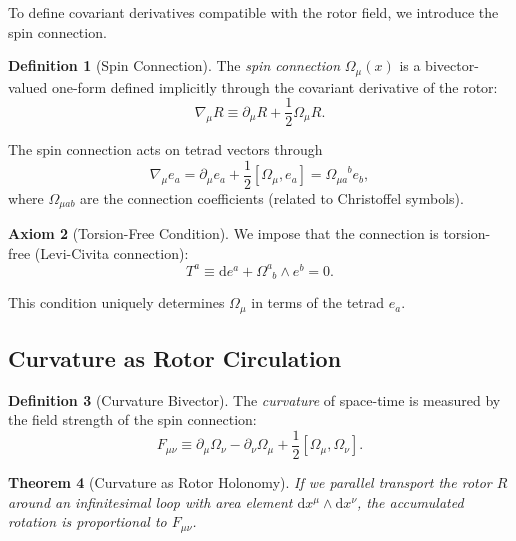\documentclass[11pt,a4paper]{article}
\numberwithin{equation}{section}
\theoremstyle{plain}
\newtheorem{theorem}{Theorem}[section]
\theoremstyle{definition}
\newtheorem{definition}[theorem]{Definition}
\newtheorem{axiom}[theorem]{Axiom}
\theoremstyle{remark}
\newcommand{\dd}{\mathrm{d}}
\begin{document}
To define covariant derivatives compatible with the rotor field, we introduce the spin connection.

\begin{definition}[Spin Connection]
The \emph{spin connection} $\Omega_\mu(x)$ is a bivector-valued one-form defined implicitly through the covariant derivative of the rotor:
\begin{equation}
\nabla_\mu R \equiv \partial_\mu R + \frac{1}{2}\Omega_\mu R.
\label{eq:spin-connection-def}
\end{equation}
\end{definition}

The spin connection acts on tetrad vectors through
\begin{equation}
\nabla_\mu e_a = \partial_\mu e_a + \frac{1}{2}[\Omega_\mu, e_a] = \Omega_{\mu a}^{\phantom{\mu a}b} e_b,
\label{eq:covariant-tetrad}
\end{equation}
where $\Omega_{\mu ab}$ are the connection coefficients (related to Christoffel symbols).

\begin{axiom}[Torsion-Free Condition]
We impose that the connection is torsion-free (Levi-Civita connection):
\begin{equation}
T^a \equiv \dd e^a + \Omega^a_{\phantom{a}b} \wedge e^b = 0.
\label{eq:torsion-free}
\end{equation}
\end{axiom}

This condition uniquely determines $\Omega_\mu$ in terms of the tetrad $e_a$.

\subsection{Curvature as Rotor Circulation}

\begin{definition}[Curvature Bivector]
The \emph{curvature} of space-time is measured by the field strength of the spin connection:
\begin{equation}
F_{\mu\nu} \equiv \partial_\mu \Omega_\nu - \partial_\nu \Omega_\mu + \frac{1}{2}[\Omega_\mu, \Omega_\nu].
\label{eq:curvature-bivector}
\end{equation}
\end{definition}

\begin{theorem}[Curvature as Rotor Holonomy]
If we parallel transport the rotor $R$ around an infinitesimal loop with area element $\dd x^\mu \wedge \dd x^\nu$, the accumulated rotation is proportional to $F_{\mu\nu}$.
\end{theorem}
\end{document}
